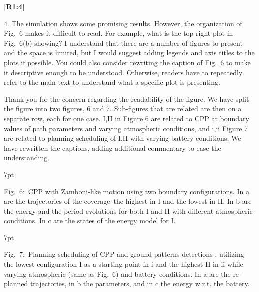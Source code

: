 \documentclass[10pt]{letter}
\newenvironment{formal}{%
  \def\FrameCommand{%
    \hspace{1pt}%
    {\color{red}\vrule width 2pt}%
    {\color{formalshade}\vrule width 4pt}%
    \colorbox{formalshade}%
  }%
  \MakeFramed{\advance\hsize-\width\FrameRestore}%
  \noindent\hspace{-4.55pt}%
  \begin{adjustwidth}{}{7pt}%
  \vspace{2pt}\vspace{2pt}%
}
{%
  \vspace{2pt}\end{adjustwidth}\endMakeFramed%
}
\begin{document}
{\hspace*{-4.5em}\textbf{[R1:4]}\vspace*{-1.9em}}


4. The simulation shows some promising results. However, the organization of Fig.~6 makes it difficult to read. For example, what is the top right plot in Fig.~6(b) showing? I understand that there are a number of figures to present and the space is limited, but I would suggest adding legends and axis titles to the plots if possible. You could also consider rewriting the caption of Fig.~6 to make it descriptive enough to be understood. Otherwise, readers have to repeatedly refer to the main text to understand what a specific plot is presenting.

{\color{blue} 


{\hspace*{-4.5em}{[R1:4]}\vspace*{-1.9em}}

Thank you for the concern regarding the readability of the figure. We have split the figure into two figures, 6 and 7. Sub-figures that are related are then on a separate row, each for one case. I,II in Figure 6 are related to CPP at boundary values of path parameters and varying atmospheric conditions, and i,ii Figure 7 are related to planning-scheduling of I,II with varying battery conditions. We have rewritten the captions, adding additional commentary to ease the understanding.

\begin{formal}
  \footnotesize
  
  {\color{blue}Fig.~6:~\color{blue}CPP with Zamboni-like motion using two boundary configurations. In {\color{red}a} are the trajectories of the coverage--the highest in {\color{red}I} and the lowest in {\color{red}II}. In {\color{red}b} are the energy and the period evolutions for both {\color{red}I} and {\color{red}II} with different atmospheric conditions. In {\color{red}c} are the states of the energy model for {\color{red}I}.
  \vspace*{1ex}
  }
\end{formal}
\begin{formal}
  \footnotesize
  
  \vspace*{-.6ex}
  {\color{blue}
  Fig.~7:~Planning-scheduling of CPP and ground patterns detections%
  , utilizing the lowest configuration {\color{red}I} as a starting point in {\color{red}i} and the highest {\color{red}II} in {\color{red}ii} while varying atmospheric (same as Fig.~{\color{red}6}) and battery conditions. In {\color{red}a} are the re-planned trajectories, in {\color{red}b} the parameters, and in {\color{red}c} the energy w.r.t. the battery.}
  \vspace*{1ex}
\end{formal}
}
\end{document}
